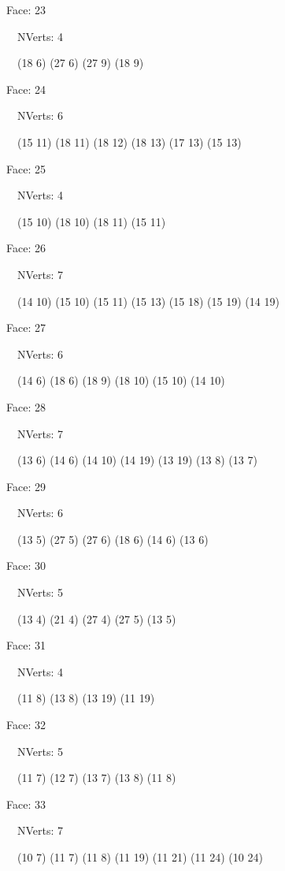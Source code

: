 \documentclass{article}
\begin{document}
{\footnotesize 

Face: 23

\   \    NVerts: 4

 \   \   (18 6) (27 6) (27 9) (18 9)}

{\footnotesize 

Face: 24

\   \    NVerts: 6

 \   \   (15 11) (18 11) (18 12) (18 13) (17 13) (15 13)}

{\footnotesize 

Face: 25

\   \    NVerts: 4

 \   \   (15 10) (18 10) (18 11) (15 11)}

{\footnotesize 

Face: 26

\   \    NVerts: 7

 \   \   (14 10) (15 10) (15 11) (15 13) (15 18) (15 19) (14 19)}

{\footnotesize 

Face: 27

\   \    NVerts: 6

 \   \   (14 6) (18 6) (18 9) (18 10) (15 10) (14 10)}

{\footnotesize 

Face: 28

\   \    NVerts: 7

 \   \   (13 6) (14 6) (14 10) (14 19) (13 19) (13 8) (13 7)}

{\footnotesize 

Face: 29

\   \    NVerts: 6

 \   \   (13 5) (27 5) (27 6) (18 6) (14 6) (13 6)}

{\footnotesize 

Face: 30

\   \    NVerts: 5

 \   \   (13 4) (21 4) (27 4) (27 5) (13 5)}

{\footnotesize 

Face: 31

\   \    NVerts: 4

 \   \   (11 8) (13 8) (13 19) (11 19)}

{\footnotesize 

Face: 32

\   \    NVerts: 5

 \   \   (11 7) (12 7) (13 7) (13 8) (11 8)}

{\footnotesize 

Face: 33

\   \    NVerts: 7

 \   \   (10 7) (11 7) (11 8) (11 19) (11 21) (11 24) (10 24)}
\end{document}
